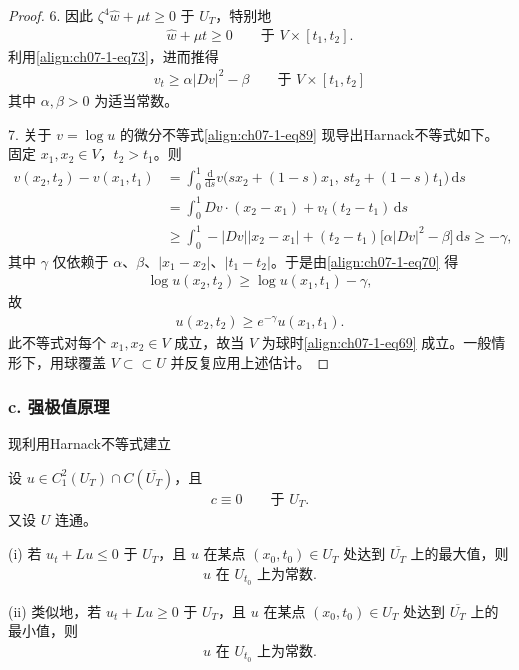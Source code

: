 \documentclass[../../main.tex]{subfiles}
\begin{document}
\begin{proof}
6. 因此 $\zeta^4\widehat{w}+\mu t\geqslant 0$ 于 $U_T$，特别地
\begin{align*}
\widehat{w}+\mu t\geqslant 0\qquad \text{于 } V\times[t_1,t_2].
\end{align*}
利用\eqref{align:ch07-1-eq73}，进而推得
\begin{align}
v_t \geqslant \alpha|Dv|^2 - \beta\qquad \text{于 } V\times[t_1,t_2]\label{align:ch07-1-eq89}
\end{align}
其中 $\alpha,\beta>0$ 为适当常数。

7. 关于 $v=\log u$ 的微分不等式\eqref{align:ch07-1-eq89} 现导出Harnack不等式如下。固定 $x_1,x_2\in V$，$t_2>t_1$。则
\begin{align*}
v(x_2,t_2)-v(x_1,t_1) &= \int_0^1 \frac{\mathrm{d}}{\mathrm{d}s}v\bigl(sx_2+(1-s)x_1,\, st_2+(1-s)t_1\bigr)\,\mathrm{d}s\\
&= \int_0^1 Dv\cdot(x_2-x_1) + v_t(t_2-t_1)\,\mathrm{d}s\\
&\geqslant \int_0^1 -|Dv||x_2-x_1| + (t_2-t_1)\bigl[\alpha|Dv|^2-\beta\bigr]\,\mathrm{d}s \geqslant -\gamma,
\end{align*}
其中 $\gamma$ 仅依赖于 $\alpha$、$\beta$、$|x_1-x_2|$、$|t_1-t_2|$。于是由\eqref{align:ch07-1-eq70} 得
\begin{align*}
\log u(x_2,t_2) \geqslant \log u(x_1,t_1)-\gamma,
\end{align*}
故
\begin{align*}
u(x_2,t_2) \geqslant e^{-\gamma}u(x_1,t_1).
\end{align*}
此不等式对每个 $x_1,x_2\in V$ 成立，故当 $V$ 为球时\eqref{align:ch07-1-eq69} 成立。一般情形下，用球覆盖 $V\subset\subset U$ 并反复应用上述估计。
\end{proof}

\subsubsection*{c. 强极值原理}

现利用Harnack不等式建立

\begin{theorem}[强极值原理。]\label{theorem:ch07-1-强极值原理}设 $u\in C^2_1(U_T)\cap C(\overline{U_T})$，且
\begin{align*}
c\equiv 0\qquad \text{于 } U_T.
\end{align*}
又设 $U$ 连通。

(i) 若 $u_t+Lu\leqslant 0$ 于 $U_T$，且 $u$ 在某点 $(x_0,t_0)\in U_T$ 处达到 $\overline{U_T}$ 上的最大值，则
\begin{align*}
u \text{ 在 } U_{t_0} \text{ 上为常数}.
\end{align*}

(ii) 类似地，若 $u_t+Lu\geqslant 0$ 于 $U_T$，且 $u$ 在某点 $(x_0,t_0)\in U_T$ 处达到 $\overline{U_T}$ 上的最小值，则
\begin{align*}
u \text{ 在 } U_{t_0} \text{ 上为常数}.
\end{align*}
\end{theorem}
\end{document}
